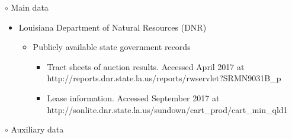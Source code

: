 \documentclass[12pt,english]{article}
\begin{document}
	$\circ$ Main data
	\begin{itemize}
		\item Louisiana Department of Natural Resources (DNR)
		\begin{itemize}
			\item Publicly available state government records
			\begin{itemize}
				\item \citet{dnrauc} Tract sheets of auction results. Accessed April 2017 at \\
				http://reports.dnr.state.la.us/reports/rwservlet?SRMN9031B\_p
				\item \citet{dnrlse} Lease information. Accessed September 2017 at\\
				http://sonlite.dnr.state.la.us/sundown/cart\_prod/cart\_min\_qld1
			\end{itemize}
		\end{itemize}
	\end{itemize}
	$\circ$ Auxiliary data
\end{document}

